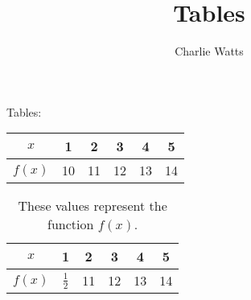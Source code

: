 \documentclass[12pt]{article}
\title{Tables}
\author{Charlie Watts}
\date{\null}
\begin{document}
\maketitle

Tables:\\

\begin{tabular}{|c||c|c|c|c|c|}
\hline
$x$ &1&2&3&4&5 \\ 
\hline
$f(x)$ &10&11&12&13&14 \\
\hline
\end{tabular}

\vspace{1 cm}
\begin{table}[H]
\centering
\def\arraystretch{1.5}
\begin{tabular}{|c||c|c|c|c|c|}
\hline
$x$ &1&2&3&4&5 \\
\hline
$f(x)$ &$\frac{1}{2}$&11&12&13&14 \\ 
\hline
\end{tabular}
\caption{These values represent the function $f(x)$.}
\end{table}
\end{document}
